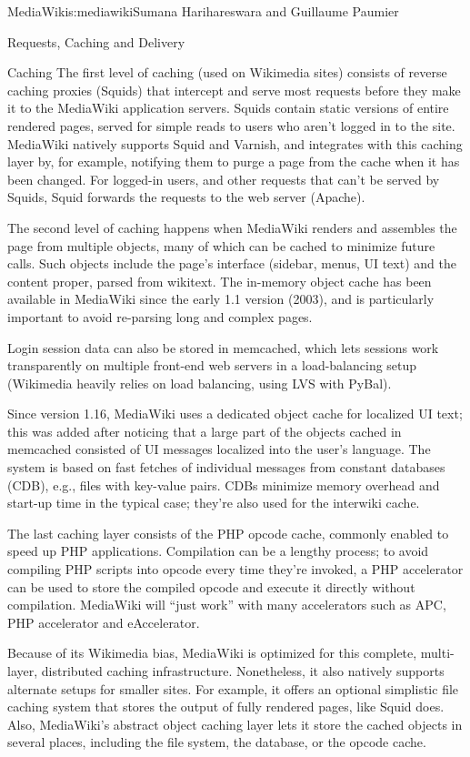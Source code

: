 \begin{aosachapter}{MediaWiki}{s:mediawiki}{Sumana Harihareswara and Guillaume Paumier}
\begin{aosasect1}{Requests, Caching and Delivery}
\begin{aosasect2}{Caching}
The first level of caching (used on Wikimedia sites) consists of
reverse caching proxies (Squids) that intercept and serve most
requests before they make it to the MediaWiki application
servers. Squids contain static versions of entire rendered pages,
served for simple reads to users who aren't logged in to the
site. MediaWiki natively supports Squid and Varnish, and integrates
with this caching layer by, for example, notifying them to purge a
page from the cache when it has been changed. For logged-in users, and
other requests that can't be served by Squids, Squid forwards the
requests to the web server (Apache).

The second level of caching happens when MediaWiki renders and
assembles the page from multiple objects, many of which can be cached
to minimize future calls. Such objects include the page's interface
(sidebar, menus, UI text) and the content proper, parsed from
wikitext. The in-memory object cache has been available in MediaWiki
since the early 1.1 version (2003), and is particularly important to
avoid re-parsing long and complex pages.

Login session data can also be stored in memcached, which lets
sessions work transparently on multiple front-end web servers in a
load-balancing setup (Wikimedia heavily relies on load balancing,
using LVS with PyBal).

Since version 1.16, MediaWiki uses a dedicated object cache for
localized UI text; this was added after noticing that a large part of
the objects cached in memcached consisted of UI messages localized
into the user's language. The system is based on fast fetches of
individual messages from constant databases (CDB), e.g., files with
key-value pairs. CDBs minimize memory overhead and start-up time in
the typical case; they're also used for the interwiki cache.

The last caching layer consists of the PHP opcode cache, commonly
enabled to speed up PHP applications. Compilation can be a lengthy
process; to avoid compiling PHP scripts into opcode every time they're
invoked, a PHP accelerator can be used to store the compiled opcode
and execute it directly without compilation. MediaWiki will ``just
work'' with many accelerators such as APC, PHP accelerator and
eAccelerator.

Because of its Wikimedia bias, MediaWiki is optimized for this
complete, multi-layer, distributed caching
infrastructure. Nonetheless, it also natively supports alternate
setups for smaller sites. For example, it offers an optional
simplistic file caching system that stores the output of fully
rendered pages, like Squid does. Also, MediaWiki's abstract object
caching layer lets it store the cached objects in several places,
including the file system, the database, or the opcode cache.


\end{aosasect2}
\end{aosasect1}
\end{aosachapter}
